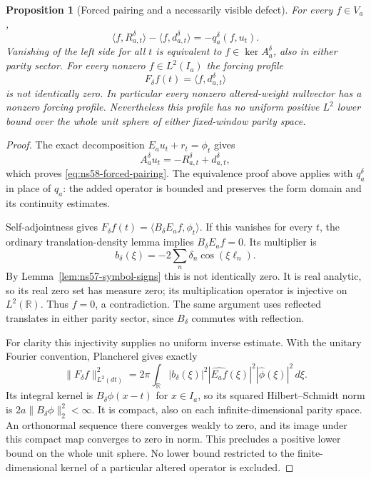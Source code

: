 \documentclass[11pt]{article}
\newtheorem{proposition}[theorem]{Proposition}
\theoremstyle{remark}
\begin{document}
\begin{proposition}[Forced pairing and a necessarily visible defect]
\label{prop:ns58-forced-pairing}
For every $f\in V_a$,
\begin{equation}\label{eq:ns58-forced-pairing}
 \langle f,R_{a,t}^\delta\rangle-
 \langle f,d_{a,t}^\delta\rangle=-q_a^\delta(f,u_t).
\end{equation}
Vanishing of the left side for all $t$ is equivalent to
$f\in\ker A_a^\delta$, also in either parity sector.
For every nonzero $f\in L^2(I_a)$ the forcing profile
\[
 F_\delta f(t)=\langle f,d_{a,t}^\delta\rangle
\]
is not identically zero. In particular every nonzero altered-weight
nullvector has a nonzero forcing profile. Nevertheless this profile
has no uniform positive $L^2$ lower bound over the whole unit sphere
of either fixed-window parity space.
\end{proposition}
\begin{proof}
The exact decomposition $E_a u_t+r_t=\phi_t$ gives
\[
 A_a^\delta u_t=-R_{a,t}^\delta+d_{a,t}^\delta,
\]
which proves \eqref{eq:ns58-forced-pairing}. The equivalence proof
above applies with $q_a^\delta$ in place of $q_a$: the added operator
is bounded and preserves the form domain and its continuity estimates.

Self-adjointness gives
$F_\delta f(t)=\langle B_\delta E_a f,\phi_t\rangle$.
If this vanishes for every $t$, the ordinary translation-density
lemma implies $B_\delta E_a f=0$. Its multiplier is
\[
 b_\delta(\xi)=-2\sum_n\delta_n\cos(\xi\ell_n).
\]
By Lemma~\ref{lem:ns57-symbol-signs} this is not identically zero.
It is real analytic, so its real zero set has measure zero; its
multiplication operator is injective on $L^2(\mathbb R)$.
Thus $f=0$, a contradiction. The same argument uses reflected
translates in either parity sector, since $B_\delta$ commutes
with reflection.

For clarity this injectivity supplies no uniform inverse estimate.
With the unitary Fourier convention, Plancherel gives exactly
\[
 \|F_\delta f\|_{L^2(dt)}^2
   =2\pi\int_{\mathbb R}|b_\delta(\xi)|^2
                |\widehat{E_a f}(\xi)|^2|\widehat\phi(\xi)|^2\,d\xi.
\]
Its integral kernel is $B_\delta\phi(x-t)$ for $x\in I_a$,
so its squared Hilbert--Schmidt norm is
$2a\|B_\delta\phi\|_2^2<\infty$. It is compact, also on
each infinite-dimensional parity space. An orthonormal sequence
there converges weakly to zero, and its image under this compact
map converges to zero in norm. This precludes a positive lower
bound on the whole unit sphere. No lower bound restricted to the
finite-dimensional kernel of a particular altered operator is excluded.
\end{proof}
\end{document}
